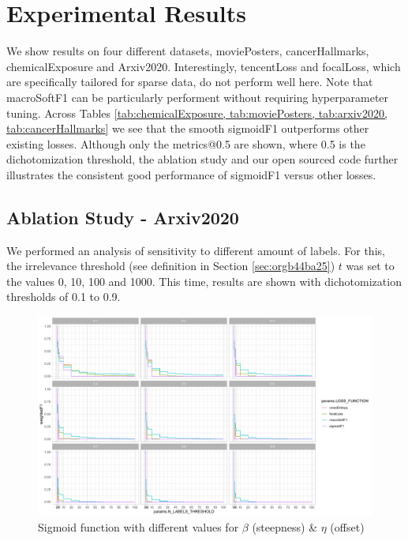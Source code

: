 
\section{Experimental Results}
\label{sec:orgc23a664}

We show results on four different datasets, moviePosters, cancerHallmarks, chemicalExposure and Arxiv2020.
Interestingly, tencentLoss and focalLoss, which are specifically tailored for sparse data, do not perform well here. Note that macroSoftF1 can be particularly performent without requiring hyperparameter tuning. Across Tables \ref{tab:chemicalExposure, tab:moviePosters, tab:arxiv2020, tab:cancerHallmarks} we see that the smooth sigmoidF1 outperforms other existing losses. Although only the metrics@0.5 are shown, where 0.5 is the dichotomization threshold, the ablation study and our open sourced code further illustrates the consistent good performance of sigmoidF1 versus other losses.

\subsection{Ablation Study - Arxiv2020}

We performed an analysis of sensitivity to different amount of labels. For this, the irrelevance threshold (see definition in Section \ref{sec:orgb44ba25}) $t$ was set to the values 0, 10, 100 and 1000. This time, results are shown with dichotomization thresholds of 0.1 to 0.9. 


\begin{figure}[htbp]
\centering
\includegraphics[width=.9\linewidth]{./images/ablation.pdf}
\caption{\label{fig:ablation}
Sigmoid function with different values for $\beta$ (steepness) \& $\eta$ (offset)}
\end{figure}


